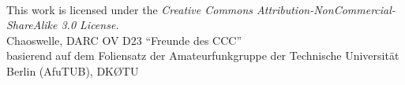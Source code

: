 

\begin{frame}
    \titlepage
    \vfill
    \begin{center}
        \ccbyncsaeu\\
        {\tiny This work is licensed under the \em{Creative Commons Attribution-NonCommercial-ShareAlike 3.0 License}.}\\[0.5ex]
         \tiny Chaoswelle, DARC OV D23 “Freunde des CCC”\\
         \tiny basierend auf dem Foliensatz der
         \tiny Amateurfunkgruppe der Technische Universität Berlin (AfuTUB), DKØTU
    \end{center}
\end{frame}
